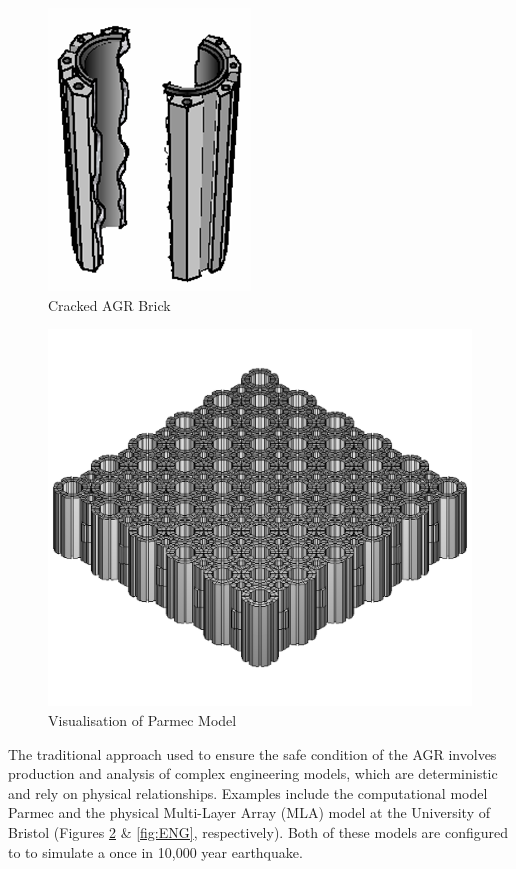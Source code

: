 \begin{figure}[ht!]
	\centering
	\includegraphics[scale=0.65]{Figures/Brick_Cracking}
	\caption{Cracked AGR Brick}
	\label{fig:cracked}
\end{figure}

\begin{figure}[b!]
	\centering
	\includegraphics[scale=0.12]{Figures/parmec_bricks.png}
	\caption{Visualisation of Parmec Model}
	\label{fig:FEA}
\end{figure}

\noindent
The traditional approach used to ensure the safe condition of the AGR involves production and analysis of complex engineering models, which are deterministic and rely on physical relationships. Examples include the computational model Parmec \cite{wiki:xxx} and the physical Multi-Layer Array (MLA) model \cite{dihoru2014multi} at the University of Bristol (Figures \ref{fig:FEA} \& \ref{fig:ENG}, respectively). Both of these models are configured to to simulate a once in 10,000 year earthquake. \\

